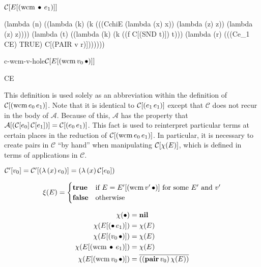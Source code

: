 \begin{schemedefinition}{$\mathcal{C}[E[(\mathrm{wcm}\,\bullet\,e_1)]]$}
\begin{schemeblock}
\begin{schemedisplay}
(lambda (n) ((lambda (k) 
               (k (((CchiE (lambda (x) x)) (lambda (z) z)) (lambda (z) z))))
             (lambda (t) 
               ((lambda (k) (k ((f C[(SND t)]) t)))
                  (lambda (r) 
                    (((Ce_1 CE) TRUE) C[(PAIR v r)]))))))
\end{schemedisplay}
\end{schemeblock}
\end{schemedefinition}

\begin{namedschemedefinition}{c-wcm-v-hole}{$\mathcal{C}[E[(\mathrm{wcm}\,v_0\,\bullet)]]$}
\begin{schemeblock}
\begin{schemedisplay}
CE
\end{schemedisplay}
\end{schemeblock}
\end{namedschemedefinition}

This definition is used solely as an abbreviation within the definition of
$\mathcal{C}[(\mathrm{wcm}\,e_0\,e_1)]$. Note that it is identical to $\mathcal{C}[(e_1\,e_1)]$ except that
$\mathcal{C}$ does not recur in the body of $\mathcal{A}$. Because of this, $\mathcal{A}$
has the property that $\mathcal{A}[(\mathcal{C}[e_0]\,\mathcal{C}[e_1])]=\mathcal{C}[(e_0\,e_1)]$. This fact
is used to reinterpret particular terms at certain places in the reduction of
$\mathcal{C}[(\mathrm{wcm}\,e_0\,e_1)]$. In particular, it is necessary to create pairs in $\mathcal{C}$ ``by
hand'' when manipulating $\mathcal{C}[\chi(E)]$, which is defined in terms of applications in
$\mathcal{C}$.

\begin{definition}
$\mathcal{C}'[v_0]=\mathcal{C}'[(\lambda\,(x)\,e_0)]=(\lambda\,(x)\,\mathcal{C}[e_0])$
\end{definition}

\begin{definition}
\[
\xi(E)=\begin{cases}
\mathbf{true} &\text{if $E=E'[(\mathrm{wcm}\,v'\,\bullet)]$ for some $E'$ and $v'$}\\
\mathbf{false} &\text{otherwise}
\end{cases}
\]
\end{definition}

\begin{definition}
\begin{align*}
\chi(\bullet)               &= \mathbf{nil}\\
\chi(E[(\bullet\,e_1)]) &= \chi(E)\\
\chi(E[(v_0\,\bullet)]) &= \chi(E)\\
\chi(E[(\mathrm{wcm}\,\bullet\,e_1)]) &= \chi(E)\\
\chi(E[(\mathrm{wcm}\,v_0\,\bullet)]) &= \overline{((\mathbf{pair}\,v_0)\,\chi(E))}\\
\end{align*}
\end{definition}

